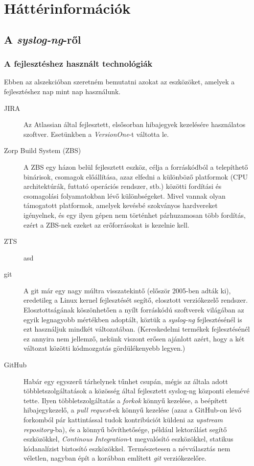 \chapter{Háttérinformációk}

\section{A \emph{syslog-ng}-ről}

\subsection{A fejlesztéshez használt technológiák}

Ebben az alszekcióban szeretném bemutatni azokat az eszközöket, amelyek a fejlesztéshez nap mint nap
használunk.

\begin{description}
    \item[JIRA] {Az Atlassian által fejlesztett, elsősorban hibajegyek kezelésére használatos
        szoftver. Esetünkben a \emph{VersionOne}-t váltotta le.}
    \item[Zorp Build System (ZBS)] {A ZBS egy házon belül fejlesztett eszköz, célja a forráskódból
        a telepíthető binárisok, csomagok előállítása, azaz elfedni a különböző platformok (CPU
        architektúrák, futtató operációs rendszer, stb.) közötti fordítási és csomagolási
        folyamatokban lévő különbségeket. Mivel vannak olyan támogatott platformok, amelyek
        kevésbé szokványos hardvereket igényelnek, és egy ilyen gépen nem történhet párhuzamosan
        több fordítás, ezért a ZBS-nek ezeket az erőforrásokat is kezelnie kell. }
    \item[ZTS] {asd }
    \item[git] {A git már egy nagy múltra visszatekintő (először 2005-ben adták ki), eredetileg a
        Linux kernel fejlesztését segítő, elosztott verziókezelő rendszer. Elosztottságának
        köszönhetően a nyílt forráskódú szoftverek világában az egyik legnagyobb mértékben
        adoptált, köztük a \emph{syslog-ng} fejlesztésénél is ezt használjuk mindkét változatában.
        (Kereskedelmi termékek fejlesztésénél ez annyira nem jellemző, nekünk viszont erősen
        ajánlott azért, hogy a két változat közötti kódmozgatás gördülékenyebb legyen.)}
    \item[GitHub] {Habár egy egyszerű tárhelynek tűnhet csupán, mégis az általa adott
        többletszolgáltatások a közösség által fejlesztett syslog-ng központi elemévé tette.
        Ilyen többletszolgáltatás a \emph{forkok} könnyű kezelése, a beépített hibajegykezelő,
        a \emph{pull request}-ek könnyű kezelése (azaz a GitHub-on lévő forkomból pár
        kattintással tudok kontribúciót küldeni az \emph{upstream repository}-ba), és a könnyű
        bővíthetősége, például lektorálást segítő eszközökkel, \emph{Continous Integration}-t
        megvalósító eszközökkel, statikus kódanalízist biztosító eszközökkel.
        Természetesen a névválasztás nem véletlen, nagyban épít a korábban említett \emph{git}
        verziókezelőre.}
\end{description}

